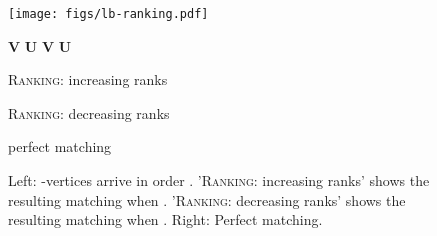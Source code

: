 \documentclass[a4paper]{article}
\begin{document}
\begin{figure}
{\small
\begin{center}
\texttt{[image: figs/lb-ranking.pdf]}

\vspace{-3.03cm}
\textbf{V} \hspace{0.25cm} \textbf{U} \hspace{0.25cm} \textbf{V} \hspace{0.25cm} \textbf{U} \hspace{10.6cm} 

\vspace{0.23cm}


 \hspace{0.25cm}  \hspace{0.30cm}  \hspace{0.25cm}  \hspace{10.6cm} 

\vspace{0.32cm}

 \hspace{0.25cm}  \hspace{0.30cm}  \hspace{0.25cm}  \hspace{10.6cm} 

\vspace{0.32cm}

 \hspace{0.25cm}  \hspace{0.30cm}  \hspace{0.25cm}  \hspace{10.6cm} 

\vspace{0.32cm}

 \hspace{0.25cm}  \hspace{0.30cm}  \hspace{0.25cm}  \hspace{10.6cm} 


\vspace{-0.1cm}

\hspace{3.8cm} \begin{minipage}{2cm}
\textsc{Ranking}: increasing ranks
\end{minipage} \hspace{1.4cm}
\begin{minipage}{2cm}
\textsc{Ranking}: decreasing ranks
\end{minipage} \hspace{1.2cm}
\begin{minipage}{2.5cm}
perfect matching


\end{minipage}


\end{center}
}
\caption{Left: -vertices arrive in order .
'\textsc{Ranking}: increasing ranks' shows the resulting matching when
.
'\textsc{Ranking}: decreasing ranks' shows the resulting matching when
.
Right: Perfect matching.
\label{fig:lb-ranking}}
\end{figure}
\end{document}
